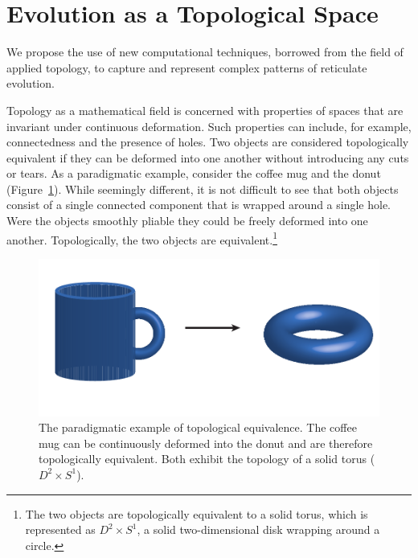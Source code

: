 \section{Evolution as a Topological Space}

We propose the use of new computational techniques, borrowed from the field of applied topology, to capture and represent complex patterns of reticulate evolution.

Topology as a mathematical field is concerned with properties of spaces that are invariant under continuous deformation.
Such properties can include, for example, connectedness and the presence of holes.
Two objects are considered topologically equivalent if they can be deformed into one another without introducing any cuts or tears.
As a paradigmatic example, consider the coffee mug and the donut (Figure~\ref{intro:fig:coffeemug_to_donut}).
While seemingly different, it is not difficult to see that both objects consist of a single connected component that is wrapped around a single hole.
Were the objects smoothly pliable they could be freely deformed into one another.
Topologically, the two objects are equivalent.\footnote{The two objects are topologically equivalent to a solid torus, which is represented as $D^2\times S^1$, a solid two-dimensional disk wrapping around a circle.}

\begin{figure}[t]
\centering
\includegraphics[width=\columnwidth]{./fig/introduction/coffeemug_to_donut.pdf}
\caption[Topological equivalence of the coffee mug and the donut]{The paradigmatic example of topological equivalence. The coffee mug can be continuously deformed into the donut and are therefore topologically equivalent. Both exhibit the topology of a solid torus ($D^2\times S^1$).}
\label{intro:fig:coffeemug_to_donut}
\end{figure}

